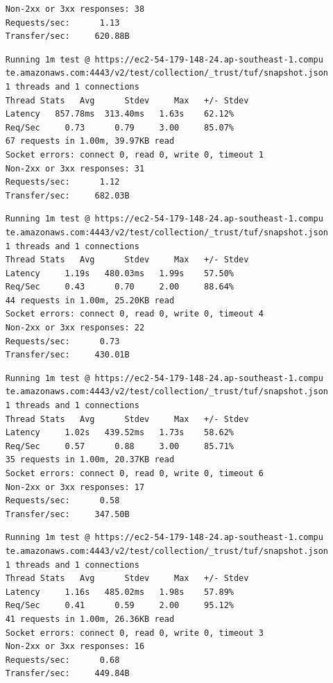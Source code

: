 \documentclass[a4paper,12pt]{article}
\newcounter{subsubsubsection}[subsubsection]
\begin{document}
{{\begin{verbatim}
	Non-2xx or 3xx responses: 38
	Requests/sec:      1.13
	Transfer/sec:     620.88B
	\end{verbatim}
	\newpage
	\begin{verbatim}
	Running 1m test @ https://ec2-54-179-148-24.ap-southeast-1.compu
	te.amazonaws.com:4443/v2/test/collection/_trust/tuf/snapshot.json
	1 threads and 1 connections
	Thread Stats   Avg      Stdev     Max   +/- Stdev
	Latency   857.78ms  313.40ms   1.63s    62.12%
	Req/Sec     0.73      0.79     3.00     85.07%
	67 requests in 1.00m, 39.97KB read
	Socket errors: connect 0, read 0, write 0, timeout 1
	Non-2xx or 3xx responses: 31
	Requests/sec:      1.12
	Transfer/sec:     682.03B
	\end{verbatim}
	\newpage
	
	\begin{verbatim}
	Running 1m test @ https://ec2-54-179-148-24.ap-southeast-1.compu
	te.amazonaws.com:4443/v2/test/collection/_trust/tuf/snapshot.json
	1 threads and 1 connections
	Thread Stats   Avg      Stdev     Max   +/- Stdev
	Latency     1.19s   480.03ms   1.99s    57.50%
	Req/Sec     0.43      0.70     2.00     88.64%
	44 requests in 1.00m, 25.20KB read
	Socket errors: connect 0, read 0, write 0, timeout 4
	Non-2xx or 3xx responses: 22
	Requests/sec:      0.73
	Transfer/sec:     430.01B
	\end{verbatim}
	\begin{verbatim}
	Running 1m test @ https://ec2-54-179-148-24.ap-southeast-1.compu
	te.amazonaws.com:4443/v2/test/collection/_trust/tuf/snapshot.json
	1 threads and 1 connections
	Thread Stats   Avg      Stdev     Max   +/- Stdev
	Latency     1.02s   439.52ms   1.73s    58.62%
	Req/Sec     0.57      0.88     3.00     85.71%
	35 requests in 1.00m, 20.37KB read
	Socket errors: connect 0, read 0, write 0, timeout 6
	Non-2xx or 3xx responses: 17
	Requests/sec:      0.58
	Transfer/sec:     347.50B
	\end{verbatim}
	\begin{verbatim}
	Running 1m test @ https://ec2-54-179-148-24.ap-southeast-1.compu
	te.amazonaws.com:4443/v2/test/collection/_trust/tuf/snapshot.json
	1 threads and 1 connections
	Thread Stats   Avg      Stdev     Max   +/- Stdev
	Latency     1.16s   485.02ms   1.98s    57.89%
	Req/Sec     0.41      0.59     2.00     95.12%
	41 requests in 1.00m, 26.36KB read
	Socket errors: connect 0, read 0, write 0, timeout 3
	Non-2xx or 3xx responses: 16
	Requests/sec:      0.68
	Transfer/sec:     449.84B
	\end{verbatim}
}}
\end{document}
